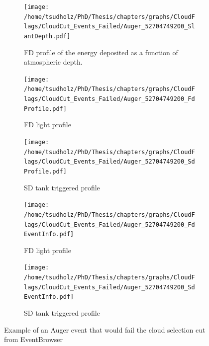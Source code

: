 \begin{figure}
\centering
 \vspace{2cm}
  \begin{subfigure}[b]{\textwidth}
  \centering
  \texttt{[image: /home/tsudholz/PhD/Thesis/chapters/graphs/CloudFlags/CloudCut\_Events\_Failed/Auger\_52704749200\_SlantDepth.pdf]}
  \caption{FD profile of the energy deposited as a function of atmospheric depth.}
  \end{subfigure}
 \vspace{0.5cm}
  \begin{subfigure}[b]{0.45\textwidth}
  	\centering
  	\texttt{[image: /home/tsudholz/PhD/Thesis/chapters/graphs/CloudFlags/CloudCut\_Events\_Failed/Auger\_52704749200\_FdProfile.pdf]}
  	\caption{FD light profile}
  \end{subfigure}
  \begin{subfigure}[b]{0.45\textwidth}
  	\centering
  	\texttt{[image: /home/tsudholz/PhD/Thesis/chapters/graphs/CloudFlags/CloudCut\_Events\_Failed/Auger\_52704749200\_SdProfile.pdf]}
  	\caption{SD tank triggered profile}
  \end{subfigure}

  \begin{subfigure}[b]{0.45\textwidth}
  	\centering
	\texttt{[image: /home/tsudholz/PhD/Thesis/chapters/graphs/CloudFlags/CloudCut\_Events\_Failed/Auger\_52704749200\_FdEventInfo.pdf]}
  	\caption{FD light profile}
  \end{subfigure}
  \begin{subfigure}[b]{0.45\textwidth}
  	\centering
	\texttt{[image: /home/tsudholz/PhD/Thesis/chapters/graphs/CloudFlags/CloudCut\_Events\_Failed/Auger\_52704749200\_SdEventInfo.pdf]}
  	\caption{SD tank triggered profile}
  \end{subfigure}
  \caption{Example of an Auger event that would fail the cloud selection cut from EventBrowser}
\end{figure}

